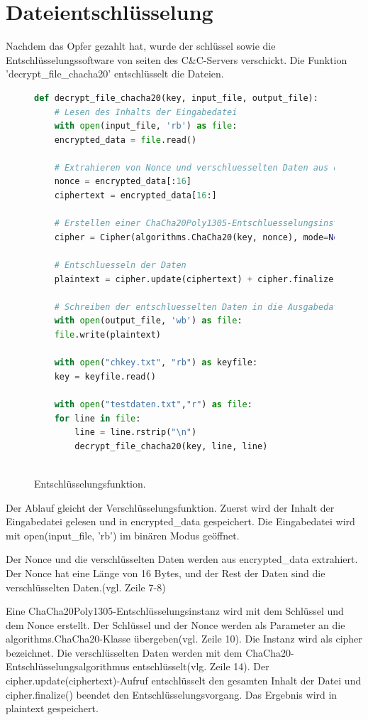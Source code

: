 \documentclass[12pt]{article}
\begin{document}
\section{Dateientschlüsselung}
Nachdem das Opfer gezahlt hat, wurde der schlüssel sowie die Entschlüsselungssoftware von seiten des C\&C-Servers verschickt. Die Funktion 'decrypt\_file\_chacha20' entschlüsselt die Dateien.
\begin{figure}[h]
\caption{Entschlüsselungsfunktion.}
\begin{lstlisting}[language=python, style=code]
def decrypt_file_chacha20(key, input_file, output_file):
	# Lesen des Inhalts der Eingabedatei
	with open(input_file, 'rb') as file:
	encrypted_data = file.read()

	# Extrahieren von Nonce und verschluesselten Daten aus der Datei
	nonce = encrypted_data[:16]
	ciphertext = encrypted_data[16:]

	# Erstellen einer ChaCha20Poly1305-Entschluesselungsinstanz mit dem Schluessel und Nonce
	cipher = Cipher(algorithms.ChaCha20(key, nonce), mode=None, backend=default_backend()).decryptor()

	# Entschluesseln der Daten
	plaintext = cipher.update(ciphertext) + cipher.finalize()

	# Schreiben der entschluesselten Daten in die Ausgabedatei
	with open(output_file, 'wb') as file:
	file.write(plaintext)

	with open("chkey.txt", "rb") as keyfile:
	key = keyfile.read()

	with open("testdaten.txt","r") as file:
	for line in file:
		line = line.rstrip("\n")
		decrypt_file_chacha20(key, line, line)
		
		\end{lstlisting}
		
		\end{figure}
\newpage

Der Ablauf gleicht der Verschlüsselungsfunktion. Zuerst wird der Inhalt der Eingabedatei gelesen und in encrypted\_data gespeichert. Die Eingabedatei wird mit open(input\_file, 'rb') im binären Modus geöffnet.

Der Nonce und die verschlüsselten Daten werden aus encrypted\_data extrahiert. Der Nonce hat eine Länge von 16 Bytes, und der Rest der Daten sind die verschlüsselten Daten.(vgl. Zeile 7-8)

Eine ChaCha20Poly1305-Entschlüsselungsinstanz wird mit dem Schlüssel und dem Nonce erstellt. Der Schlüssel und der Nonce werden als Parameter an die algorithms.ChaCha20-Klasse übergeben(vgl. Zeile 10). Die Instanz wird als cipher bezeichnet.
Die verschlüsselten Daten werden mit dem ChaCha20-Entschlüsselungsalgorithmus entschlüsselt(vlg. Zeile 14). Der cipher.update(ciphertext)-Aufruf entschlüsselt den gesamten Inhalt der Datei und cipher.finalize() beendet den Entschlüsselungsvorgang. Das Ergebnis wird in plaintext gespeichert.
\end{document}
